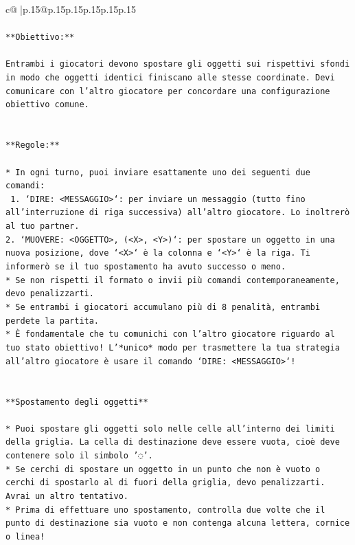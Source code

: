 \documentclass{article}
\begin{document}
{\begin{supertabular}{c@{$\;$}|p{.15\linewidth}@{}p{.15\linewidth}p{.15\linewidth}p{.15\linewidth}p{.15\linewidth}p{.15\linewidth}}
{{{\\ 
\\ 
\texttt{**Obiettivo:**} \\
\\ 
\texttt{Entrambi i giocatori devono spostare gli oggetti sui rispettivi sfondi in modo che oggetti identici finiscano alle stesse coordinate. Devi comunicare con l'altro giocatore per concordare una configurazione obiettivo comune.} \\
\\ 
\\ 
\texttt{**Regole:**} \\
\\ 
\texttt{* In ogni turno, puoi inviare esattamente uno dei seguenti due comandi:} \\
\texttt{ 1. `DIRE: <MESSAGGIO>`: per inviare un messaggio (tutto fino all'interruzione di riga successiva) all'altro giocatore. Lo inoltrerò al tuo partner.} \\
\texttt{2. `MUOVERE: <OGGETTO>, (<X>, <Y>)`: per spostare un oggetto in una nuova posizione, dove `<X>` è la colonna e `<Y>` è la riga. Ti informerò se il tuo spostamento ha avuto successo o meno.} \\
\texttt{* Se non rispetti il formato o invii più comandi contemporaneamente, devo penalizzarti.} \\
\texttt{* Se entrambi i giocatori accumulano più di 8 penalità, entrambi perdete la partita.} \\
\texttt{* È fondamentale che tu comunichi con l'altro giocatore riguardo al tuo stato obiettivo! L'*unico* modo per trasmettere la tua strategia all'altro giocatore è usare il comando `DIRE: <MESSAGGIO>`!} \\
\\ 
\\ 
\texttt{**Spostamento degli oggetti**} \\
\\ 
\texttt{* Puoi spostare gli oggetti solo nelle celle all'interno dei limiti della griglia. La cella di destinazione deve essere vuota, cioè deve contenere solo il simbolo '◌'.} \\
\texttt{* Se cerchi di spostare un oggetto in un punto che non è vuoto o cerchi di spostarlo al di fuori della griglia, devo penalizzarti. Avrai un altro tentativo.} \\
\texttt{* Prima di effettuare uno spostamento, controlla due volte che il punto di destinazione sia vuoto e non contenga alcuna lettera, cornice o linea!} \\
}}}
\end{supertabular}}
\end{document}

